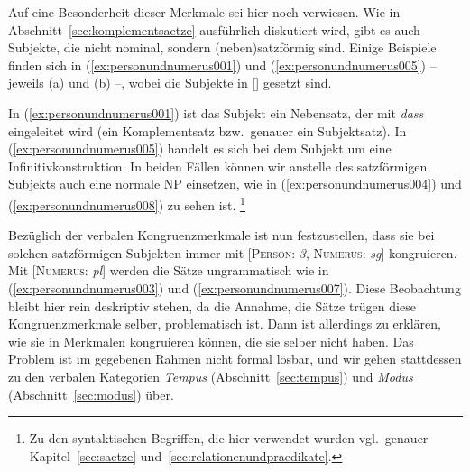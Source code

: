 Auf eine Besonderheit dieser Merkmale sei hier noch verwiesen.
Wie in Abschnitt~\ref{sec:komplementsaetze} ausführlich diskutiert wird, gibt es auch Subjekte, die nicht nominal, sondern (neben)satzförmig sind.
Einige Beispiele finden sich in (\ref{ex:personundnumerus001}) und (\ref{ex:personundnumerus005}) -- jeweils (a) und (b) --, wobei die Subjekte in [] gesetzt sind.

\begin{exe}
  \ex\label{ex:personundnumerus001}
  \begin{xlist}
  \end{xlist}
  \ex\label{ex:personundnumerus005}
  \begin{xlist}
  \end{xlist}
\end{exe}

In (\ref{ex:personundnumerus001}) ist das Subjekt ein Nebensatz, der mit \textit{dass} eingeleitet wird (ein Komplementsatz bzw.\ genauer ein Subjektsatz).
In (\ref{ex:personundnumerus005}) handelt es sich bei dem Subjekt um eine Infinitivkonstruktion.
In beiden Fällen können wir anstelle des satzförmigen Subjekts auch eine normale NP einsetzen, wie in (\ref{ex:personundnumerus004}) und (\ref{ex:personundnumerus008}) zu sehen ist.%
\footnote{Zu den syntaktischen Begriffen, die hier verwendet wurden vgl.\ genauer Kapitel~\ref{sec:saetze} und~\ref{sec:relationenundpraedikate}.}

Bezüglich der verbalen Kongruenzmerkmale ist nun festzustellen, dass sie bei solchen satzförmigen Subjekten immer mit [\textsc{Person}: \textit{3}, \textsc{Numerus}: \textit{sg}] kongruieren.
Mit [\textsc{Numerus}: \textit{pl}] werden die Sätze ungrammatisch wie in (\ref{ex:personundnumerus003}) und (\ref{ex:personundnumerus007}).
Diese Beobachtung bleibt hier rein deskriptiv stehen, da die Annahme, die Sätze trügen diese Kongruenzmerkmale selber, problematisch ist.
Dann ist allerdings zu erklären, wie sie in Merkmalen kongruieren können, die sie selber nicht haben.
Das Problem ist im gegebenen Rahmen nicht formal lösbar, und wir gehen stattdessen zu den verbalen Kategorien \textit{Tempus} (Abschnitt~\ref{sec:tempus}) und \textit{Modus} (Abschnitt~\ref{sec:modus}) über.

